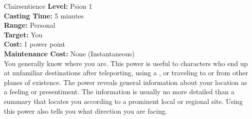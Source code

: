 {Clairsentience}
{
	\textbf{Level:}
	Psion 1\\
	\textbf{Casting Time:}
	5 minutes\\
	\textbf{Range:}
	Personal\\
	\textbf{Target:}
	You\\
	\textbf{Cost:}
	1 power point\\
	\textbf{Maintenance Cost:}
	None (Instantaneous)\\
}
{
	You generally know where you are. This power is useful to characters who end up at unfamiliar destinations after teleporting, using a , or traveling to or from other planes of existence. The power reveals general information about your location as a feeling or presentiment. The information is usually no more detailed than a summary that locates you according to a prominent local or regional site. Using this power also tells you what direction you are facing.
}